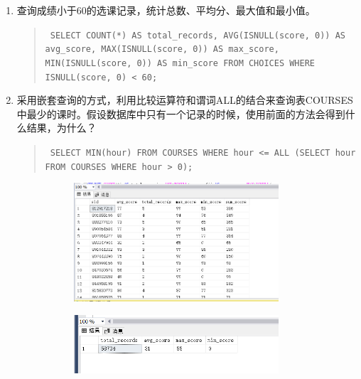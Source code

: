 \documentclass[a4paper,twoside]{article}
\begin{document}
\begin{spacing}{1.2}
\begin{enumerate}
\item 查询成绩小于60的选课记录，统计总数、平均分、最大值和最小值。
\begin{quote}
\texttt{
SELECT COUNT(*) AS total\_records, AVG(ISNULL(score, 0)) AS avg\_score, MAX(ISNULL(score, 0)) AS max\_score, MIN(ISNULL(score, 0)) AS min\_score
FROM CHOICES
WHERE ISNULL(score, 0) < 60;
}
\end{quote}
\item 采用嵌套查询的方式，利用比较运算符和谓词ALL的结合来查询表COURSES中最少的课时。假设数据库中只有一个记录的时候，使用前面的方法会得到什么结果，为什么？
\begin{quote}
\texttt{
SELECT MIN(hour) FROM COURSES WHERE hour <= ALL (SELECT hour FROM COURSES WHERE hour > 0);
}
\end{quote}


\begin{figure}[h]
\centering
\caption{运行结果}
\begin{subfigure}{0.3\textwidth}
  \includegraphics[width=0.9\textwidth]{fig34.png}
\end{subfigure}
\begin{subfigure}{0.3\textwidth}
  \includegraphics[width=0.9\textwidth]{fig35.png}
\end{subfigure}
\end{figure}


\end{enumerate}
\end{spacing}
\end{document}
